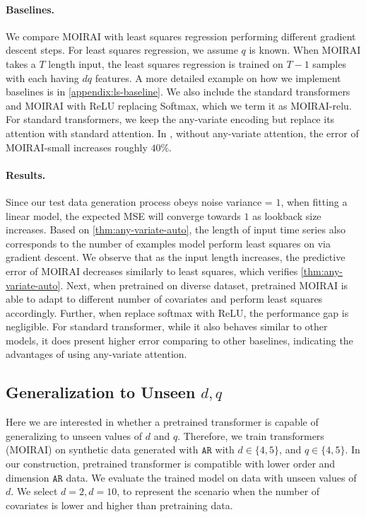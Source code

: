 \paragraph{Baselines.}
We compare MOIRAI with least squares regression performing different gradient descent steps.
For least squares regression, we assume $q$ is known.
When MOIRAI takes a $T$ length input, the least squares regression is trained on $T-1$ samples with each having $dq$ features.
A more detailed example on how we implement baselines is in \cref{appendix:ls-baseline}.
We also include the standard transformers and MOIRAI with ReLU replacing Softmax, which we term it as MOIRAI-relu.
For standard transformers, we keep the any-variate encoding but replace its attention with standard attention.
In \cite{woo2024unified}, without any-variate attention, the error of MOIRAI-small increases roughly $40\%$.
\paragraph{Results.}
Since our test data generation process obeys noise variance = $1$, when fitting a linear model, the expected MSE will converge towards $1$ as lookback size increases.
Based on \cref{thm:any-variate-auto}, the length of input time series also corresponds to the number of examples model perform least squares on via gradient descent.
We observe that as the input length increases, the predictive error of MOIRAI decreases similarly to least squares, which verifies \cref{thm:any-variate-auto}.
Next, when pretrained on diverse dataset, pretrained MOIRAI is able to adapt to different number of covariates and perform least squares accordingly.
Further, when replace softmax with ReLU, the performance gap is negligible.
For standard transformer, while it also behaves similar to other models, it does present higher error comparing to other baselines, indicating the advantages of using any-variate attention.
\subsection{Generalization to Unseen $d, q$}
Here we are interested in whether a pretrained transformer is capable of generalizing to unseen values of $d$ and $q$.
Therefore, we train transformers (MOIRAI) on synthetic data generated with $\mathtt{AR}$ with $d \in \{4, 5\}$, and $q \in \{4, 5\}$.
In our construction, pretrained transformer is compatible with lower order and dimension $\mathtt{AR}$ data.
We evaluate the trained model on data with unseen values of $d$.
We select $d=2, d=10$, to represent the scenario when the number of covariates is lower and higher than pretraining data.
